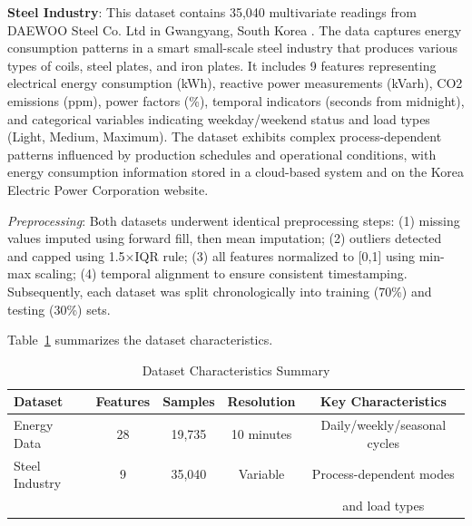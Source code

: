\documentclass[final,authoryear,3p,times,review,sort&compress]{elsarticle}
\begin{document}
\textbf{Steel Industry}: This dataset contains 35,040 multivariate readings from DAEWOO Steel Co. Ltd in Gwangyang, South Korea \citep{data:steel_uci}. The data captures energy consumption patterns in a smart small-scale steel industry that produces various types of coils, steel plates, and iron plates. It includes 9 features representing electrical energy consumption (kWh), reactive power measurements (kVarh), CO2 emissions (ppm), power factors (\%), temporal indicators (seconds from midnight), and categorical variables indicating weekday/weekend status and load types (Light, Medium, Maximum). The dataset exhibits complex process-dependent patterns influenced by production schedules and operational conditions, with energy consumption information stored in a cloud-based system and on the Korea Electric Power Corporation website.

\textit{Preprocessing}: Both datasets underwent identical preprocessing steps: (1) missing values imputed using forward fill, then mean imputation; (2) outliers detected and capped using 1.5$\times$IQR rule; (3) all features normalized to [0,1] using min-max scaling; (4) temporal alignment to ensure consistent timestamping. Subsequently, each dataset was split chronologically into training (70\%) and testing (30\%) sets.

Table~\ref{tab:datasets_exp} summarizes the dataset characteristics.
\begin{table}[htp]
\centering
\caption{Dataset Characteristics Summary}
\label{tab:datasets_exp}
\begin{tabular}{@{}lcccc@{}}
\toprule
\textbf{Dataset} & \textbf{Features} & \textbf{Samples} & \textbf{Resolution} & \textbf{Key Characteristics} \\ \midrule
Energy Data & 28 & 19,735 & 10 minutes & Daily/weekly/seasonal cycles \\
Steel Industry & 9 & 35,040 & Variable & Process-dependent modes \\ 
                 &    &        & & and load types \\
\bottomrule
\end{tabular}
\end{table}
\end{document}
